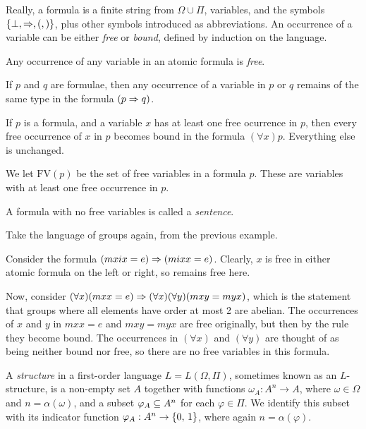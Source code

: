 \documentclass{article}
\begin{document}
Really, a formula is a finite string from $\Omega \cup \Pi$, variables, and the symbols $\left\lbrace \bot, \Rightarrow, (, ) \right\rbrace$, plus other symbols introduced as abbreviations. An occurrence of a variable can be either \textit{free} or \textit{bound}, defined by induction on the language.

\begin{definition}
    Any occurrence of any variable in an atomic formula is \textit{free}.
    
    If $p$ and $q$ are formulae, then any occurrence of a variable in $p$ or $q$ remains of the same type in the formula $(p \Rightarrow q)$.
    
    If $p$ is a formula, and a variable $x$ has at least one free ocurrence in $p$, then every free occurrence of $x$ in $p$ becomes bound in the formula $(\forall x)p$. Everything else is unchanged.
    
    We let $\mathrm{FV}(p)$ be the set of free variables in a formula $p$. These are variables with at least one free occurrence in $p$.
    
    A formula with no free variables is called a \textit{sentence}.
\end{definition}

\begin{example}
    Take the language of groups again, from the previous example.
    
    Consider the formula $(mxix=e) \Rightarrow (mixx = e)$. Clearly, $x$ is free in either atomic formula on the left or right, so remains free here.
    
    Now, consider $(\forall x)(mxx = e) \Rightarrow (\forall x)(\forall y)(mxy = myx)$, which is the statement that groups where all elements have order at most 2 are abelian. The occurrences of $x$ and $y$ in $mxx = e$ and $mxy = myx$ are free originally, but then by the rule they become bound. The occurrences in $(\forall x)$ and $(\forall y)$  are thought of as being neither bound nor free, so there are no free variables in this formula.
\end{example}

\begin{definition}[Structure]
	\label{first-order-structure}
    A \textit{structure} in a first-order language $L = L(\Omega, \Pi)$, sometimes known as an $L$-structure, is a non-empty set $A$ together with functions $\omega_A : A^n \to A$, where $\omega \in \Omega$ and $n = \alpha(\omega)$, and a subset $\varphi_A \subseteq A^n$ for each $\varphi \in \Pi$. We identify this subset with its indicator function $\varphi_A : A^n \to \left\lbrace 0, \, 1 \right\rbrace$, where again $n = \alpha(\varphi)$.
\end{definition}
\end{document}
